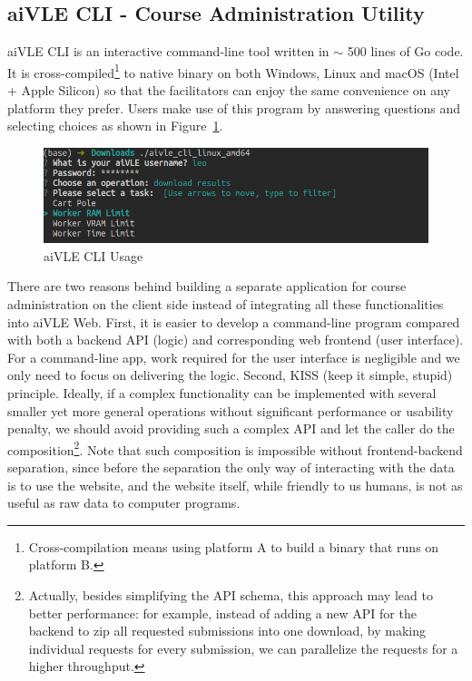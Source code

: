 \subsection{aiVLE CLI - Course Administration Utility}
\label{ss:aivle-cli}

aiVLE CLI is an interactive command-line tool written in $\sim$ 500 lines of Go code. It is cross-compiled\footnote{Cross-compilation means using platform A to build a binary that runs on platform B.} to native binary on both Windows, Linux and macOS (Intel + Apple Silicon) so that the facilitators can enjoy the same convenience on any platform they prefer. Users make use of this program by answering questions and selecting choices as shown in Figure~\ref{fig:aivle-cli}.

\begin{figure}[H]
    \centering
    \includegraphics[width=\textwidth]{images/aivle-cli.png}
    \caption{aiVLE CLI Usage}
    \label{fig:aivle-cli}
\end{figure}

There are two reasons behind building a separate application for course administration on the client side instead of integrating all these functionalities into aiVLE Web. First, it is easier to develop a command-line program compared with both a backend API (logic) and corresponding web frontend (user interface). For a command-line app, work required for the user interface is negligible and we only need to focus on delivering the logic. Second, KISS (keep it simple, stupid) principle. Ideally, if a complex functionality can be implemented with several smaller yet more general operations without significant performance or usability penalty, we should avoid providing such a complex API and let the caller do the composition\footnote{Actually, besides simplifying the API schema, this approach may lead to better performance: for example, instead of adding a new API for the backend to zip all requested submissions into one download, by making individual requests for every submission, we can parallelize the requests for a higher throughput.}. Note that such composition is impossible without frontend-backend separation, since before the separation the only way of interacting with the data is to use the website, and the website itself, while friendly to us humans, is not as useful as raw data to computer programs.

